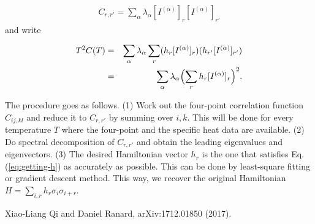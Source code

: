 \documentclass[reprint,amsmath,amssymb,aps,showpacs,superscriptaddress,prb]{revtex4-1}
\newcommand{\ba}{\begin{eqnarray}}
\newcommand{\ea}{\end{eqnarray}}
\newcommand{\nn}{\nonumber \\}
\begin{document}
\ba C_{r,r'} = \sum_\alpha \lambda_\alpha [ I^{(\alpha)} ]_r [ I^{(\alpha)} ]_{r'} \ea
and write

\ba T^2 C(T) &=& \sum_\alpha \lambda_\alpha \sum_r (h_r [ I^{(\alpha)} ]_r ) (h_{r'} [ I^{(\alpha)} ]_{r'} ) \nn
%
& =& \sum_\alpha \lambda_\alpha \Bigl( \sum_r h_r [ I^{(\alpha)} ]_r \Bigr)^2 . \label{eq:getting-h}   \ea

The procedure goes as follows. (1) Work out the four-point correlation function $C_{ij,kl}$ and reduce it to $C_{r,r'}$ by summing over $i,k$. This will be done for every temperature $T$ where the four-point and the specific heat data are available. (2) Do spectral decomposition of $C_{r,r'}$ and obtain the leading eigenvalues and eigenvectors. (3) The desired Hamiltonian vector $h_r$ is the one that satisfies Eq. (\ref{eq:getting-h}) as accurately as possible. This can be done by least-square fitting or gradient descent method. This way, we recover the original Hamiltonian $H= \sum_{i,r} h_r \sigma_i \sigma_{i+r}$.

\begin{thebibliography}{99}

 Xiao-Liang Qi and Daniel Ranard, arXiv:1712.01850 (2017).

\end{thebibliography}

%
%
\end{document}

